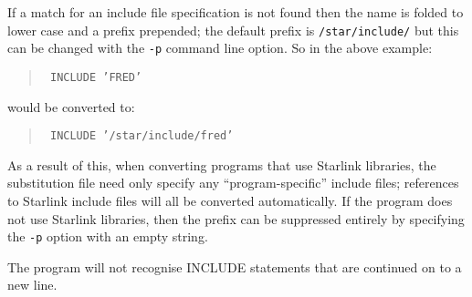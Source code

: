If a match for an include file specification is not found then the name
is folded to lower case and a prefix prepended; the default prefix is
{\tt /star/include/} but this can be changed with the {\tt -p} command line
option. So in the above example:
\begin{quote}
{\tt
       INCLUDE 'FRED'}
\end{quote}
would be converted to:
\begin{quote}
{\tt
      INCLUDE '/star/include/fred'}
\end{quote}
As a result of this,
when converting programs that use Starlink libraries, the substitution file
need only specify any ``program-specific'' include files; references to
Starlink include files will all be converted automatically. If the
program does not use Starlink libraries, then the prefix can be suppressed
entirely by specifying the {\tt -p} option with an empty string.

The program will not recognise INCLUDE statements that are continued
on to a new line.

